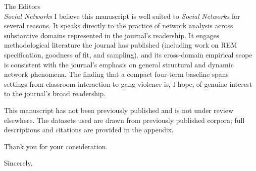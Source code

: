 \documentclass[11pt]{letter}
\begin{document}
\begin{letter}{The Editors\\
\textit{Social Networks}}
I believe this manuscript is well suited to \textit{Social Networks} for several
reasons. It speaks directly to the practice of network analysis across
substantive domains represented in the journal's readership. It engages
methodological literature the journal has published (including work on REM
specification, goodness of fit, and sampling), and its cross-domain empirical
scope is consistent with the journal's emphasis on general structural and
dynamic network phenomena. The finding that a compact four-term baseline spans
settings from classroom interaction to gang violence is, I hope, of genuine
interest to the journal's broad readership.

This manuscript has not been previously published and is not under review
elsewhere. The datasets used are drawn from previously published corpora; full
descriptions and citations are provided in the appendix.

Thank you for your consideration.

\closing{Sincerely,}

\end{letter}
\end{document}
